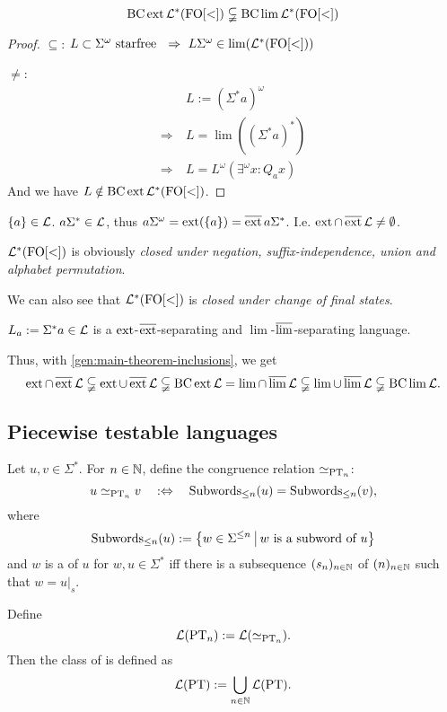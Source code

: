 \begin{theorem}
\[ \operatorname{BC} \operatorname{ext} \mathcal{L}^*( \mathrm{FO[<]} ) \subsetneqq \operatorname{BC} \lim \mathcal{L}^* ( \mathrm{FO[<]} ) \]
\begin{proof}
$\subseteq$: $L \subset \Sigma^\omega \text{ starfree } \ \Rightarrow\ L \Sigma^\omega \in \lim( \Lang^*( \mathrm{FO[<]} ) )$

$\neq$:
\begin{align*}
& L := (\Sigma^* a)^\omega \\
\Rightarrow \ & L = \lim( (\Sigma^* a)^* ) \\
\Rightarrow \ & L = L^\omega(\exists^\omega x : Q_a x)
\end{align*}
And we have $L \notin \operatorname{BC} \operatorname{ext} \mathcal{L}^* (\mathrm{FO[<]})$.
\end{proof}
\end{theorem}

$\Set{a} \in \Lang$. $a \Sigma^* \in \mathcal{L}$, thus $a\Sigma^\omega = \ext(\Set{a}) = \dext{a\Sigma^*}$. I.e. $\operatorname{ext} \cap \operatorname{\overline{ext}} \mathcal{L} \ne \emptyset$.

$\mathcal{L}^*( \mathrm{FO[<]} )$ is obviously \emph{closed under negation, suffix-independence, union and alphabet permutation}.

We can also see that $\mathcal{L}^*( \mathrm{FO[<]} )$ is \emph{closed under change of final states}. %

$L_a := \Sigma^* a \in \mathcal{L}$ is a $\operatorname{ext}$-$\operatorname{\overline{ext}}$-separating and $\lim$-$\operatorname{\overline{lim}}$-separating language.

Thus, with \cref{gen:main-theorem-inclusions}, we get
\[ \operatorname{ext} \cap \operatorname{\overline{ext}} \mathcal{L} \subsetneqq
\operatorname{ext} \cup \operatorname{\overline{ext}} \mathcal{L} \subsetneqq
\operatorname{BC} \operatorname{ext} \mathcal{L} =
\lim \cap \operatorname{\overline{lim}} \mathcal{L} \subsetneqq
\lim \cup \operatorname{\overline{lim}} \mathcal{L} \subsetneqq
\operatorname{BC} \lim \mathcal{L} . \]


\subsection{Piecewise testable languages}
\label{lang:PT}
Let $u,v \in \Sigma^*$. For $n \in \mathbb{N}$, define the congruence relation $\simeq_{\textup{\textrm{PT}}_n}$:
\[ u \simeq_{\PT_n} v \ \ \ :\Leftrightarrow \ \ \ \operatorname{Subwords}_{\le n}(u) = \operatorname{Subwords}_{\le n}(v) , \]
where
\[ \operatorname{Subwords}_{\le n}(u) := \Set{w \in \Sigma^{\le n}}{\text{$w$ is a subword of $u$}} \]
and $w$ is a  of $u$ for $w,u \in \Sigma^*$ iff there is a subsequence $(s_n)_{n\in\mathbb{N}}$ of $(n)_{n\in\mathbb{N}}$ such that $w = u|_s$.

Define
\[ \mathcal{L}(\textup{\textrm{PT}}_n) := \mathcal{L}(\simeq_{\textup{\textrm{PT}}_n}). \]
Then the class of  is defined as
\[ \mathcal{L}(\textup{\textrm{PT}}) := \bigcup_{n\in\mathbb{N}} \mathcal{L}(\textup{\textrm{PT}}) . \]


